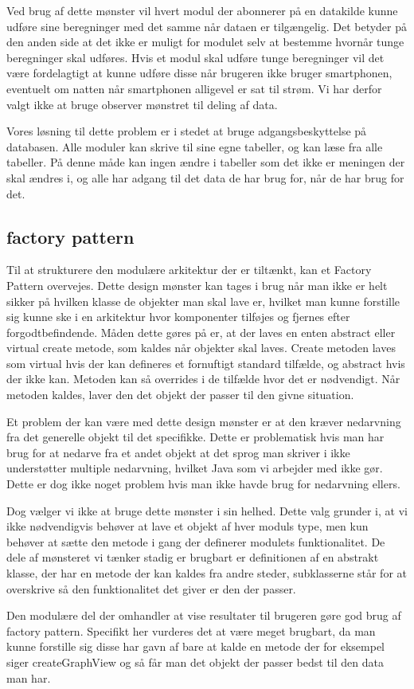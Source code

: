 Ved brug af dette mønster vil hvert modul der abonnerer på en datakilde kunne udføre sine beregninger med det samme når dataen er tilgængelig.
Det betyder på den anden side at det ikke er muligt for modulet selv at bestemme hvornår tunge beregninger skal udføres.
Hvis et modul skal udføre tunge beregninger vil det være fordelagtigt at kunne udføre disse når brugeren ikke bruger smartphonen, eventuelt om natten når smartphonen alligevel er sat til strøm.
Vi har derfor valgt ikke at bruge observer mønstret til deling af data.




Vores løsning til dette problem er i stedet at bruge adgangsbeskyttelse på databasen.
Alle moduler kan skrive til sine egne tabeller, og kan læse fra alle tabeller.
På denne måde kan ingen ændre i tabeller som det ikke er meningen der skal ændres i, og alle har adgang til det data de har brug for, når de har brug for det.



\subsection{factory pattern}
Til at strukturere den modulære arkitektur der er tiltænkt, kan et Factory Pattern overvejes.
Dette design mønster kan tages i brug når man ikke er helt sikker på hvilken klasse de objekter man skal lave er, hvilket man kunne forstille sig kunne ske i en arkitektur hvor komponenter tilføjes og fjernes efter forgodtbefindende.
Måden dette gøres på er, at der laves en enten abstract eller virtual create metode, som kaldes når objekter skal laves.
Create metoden laves som virtual hvis der kan defineres et fornuftigt standard tilfælde, og abstract hvis der ikke kan.
Metoden kan så overrides i de tilfælde hvor det er nødvendigt.
Når metoden kaldes, laver den det objekt der passer til den givne situation.

Et problem der kan være med dette design mønster er at den kræver nedarvning fra det generelle objekt til det specifikke.
Dette er problematisk hvis man har brug for at nedarve fra et andet objekt at det sprog man skriver i ikke understøtter multiple nedarvning, hvilket Java som vi arbejder med ikke gør.
Dette er dog ikke noget problem hvis man ikke havde brug for nedarvning ellers.

Dog vælger vi ikke at bruge dette mønster i sin helhed.
Dette valg grunder i, at vi ikke nødvendigvis behøver at lave et objekt af hver moduls type, men kun behøver at sætte den metode i gang der definerer modulets funktionalitet.
De dele af mønsteret vi tænker stadig er brugbart er definitionen af en abstrakt klasse, der har en metode der kan kaldes fra andre steder, subklasserne står for at overskrive så den funktionalitet det giver er den der passer.

Den modulære del der omhandler at vise resultater til brugeren gøre god brug af factory pattern.
Specifikt her vurderes det at være meget brugbart, da man kunne forstille sig disse har gavn af bare at kalde en metode der for eksempel siger createGraphView og så får man det objekt der passer bedst til den data man har.
